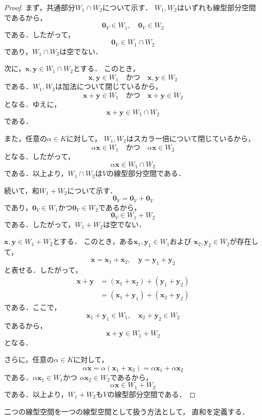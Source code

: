 \begin{leftbar}
\begin{proof}
  まず，共通部分$W_1\cap W_2$について示す．
  $W_1,W_2$はいずれも線型部分空間であるから，
  \[
    \bm{0}_V\in W_1,
    \quad
    \bm{0}_V\in W_2
  \]
  である．したがって，
  \[
    \bm{0}_V\in W_1\cap W_2
  \]
  であり，$W_1\cap W_2$は空でない．

  次に，$\bm{x},\bm{y}\in W_1\cap W_2$とする．
  このとき，
  \[
    \bm{x},\bm{y}\in W_1
    \quad\text{かつ}\quad
    \bm{x},\bm{y}\in W_2
  \]
  である．$W_1,W_2$は加法について閉じているから，
  \[
    \bm{x}+\bm{y}\in W_1
    \quad\text{かつ}\quad
    \bm{x}+\bm{y}\in W_2
  \]
  となる．ゆえに，
  \[
    \bm{x}+\bm{y}\in W_1\cap W_2
  \]
  である．

  また，任意の$\alpha\in K$に対して，
  $W_1,W_2$はスカラー倍について閉じているから，
  \[
    \alpha\bm{x}\in W_1
    \quad\text{かつ}\quad
    \alpha\bm{x}\in W_2
  \]
  となる．したがって，
  \[
    \alpha\bm{x}\in W_1\cap W_2
  \]
  である．以上より，$W_1\cap W_2$は$V$の線型部分空間である．

  続いて，和$W_1+W_2$について示す．
  \[
    \bm{0}_V=\bm{0}_V+\bm{0}_V
  \]
  であり，$\bm{0}_V\in W_1$かつ$\bm{0}_V\in W_2$であるから，
  \[
    \bm{0}_V\in W_1+W_2
  \]
  である．したがって，$W_1+W_2$は空でない．

  $\bm{x},\bm{y}\in W_1+W_2$とする．
  このとき，ある$\bm{x}_1,\bm{y}_1\in W_1$および
  $\bm{x}_2,\bm{y}_2\in W_2$が存在して，
  \[
    \bm{x}=\bm{x}_1+\bm{x}_2,
    \quad
    \bm{y}=\bm{y}_1+\bm{y}_2
  \]
  と表せる．したがって，
  \begin{align*}
    \bm{x}+\bm{y}
    &=(\bm{x}_1+\bm{x}_2)+(\bm{y}_1+\bm{y}_2)\\
    &=(\bm{x}_1+\bm{y}_1)+(\bm{x}_2+\bm{y}_2)
  \end{align*}
  である．ここで，
  \[
    \bm{x}_1+\bm{y}_1\in W_1,
    \quad
    \bm{x}_2+\bm{y}_2\in W_2
  \]
  であるから，
  \[
    \bm{x}+\bm{y}\in W_1+W_2
  \]
  となる．

  さらに，任意の$\alpha\in K$に対して，
  \[
    \alpha\bm{x}
    =\alpha(\bm{x}_1+\bm{x}_2)
    =\alpha\bm{x}_1+\alpha\bm{x}_2
  \]
  である．$\alpha\bm{x}_1\in W_1$かつ
  $\alpha\bm{x}_2\in W_2$であるから，
  \[
    \alpha\bm{x}\in W_1+W_2
  \]
  である．以上より，$W_1+W_2$も$V$の線型部分空間である．
\end{proof}
\end{leftbar}

二つの線型空間を一つの線型空間として扱う方法として，
直和を定義する．

